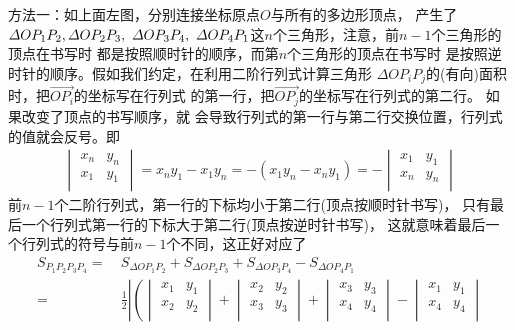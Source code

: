 \begin{itemize}[leftmargin=\inteval{\myitemleftmargin}pt,itemsep=
   \inteval{\myitemitempsep}pt,topsep=\inteval{\myitemtopsep}pt]
\begin{figure}[H]
\end{figure}
方法一：如上面左图，分别连接坐标原点$ O $与所有的多边形顶点，
产生了$ \Delta OP_1P_2,\\ \Delta OP_2P_3,\ \Delta OP_3P_4,\ 
\Delta OP_4P_1 $这$ n $个三角形，注意，前$ n-1 $个三角形的顶点在书写时
都是按照顺时针的顺序，而第$ n $个三角形的顶点在书写时
是按照逆时针的顺序。假如我们约定，在利用二阶行列式计算三角形
$ \Delta OP_iP_j $的(有向)面积时，把$ \vec{OP_i} $的坐标写在行列式
的第一行，把$ \vec{OP_j} $的坐标写在行列式的第二行。
如果改变了顶点的书写顺序，就
会导致行列式的第一行与第二行交换位置，行列式的值就会反号。即
\begin{gather*}
    \begin{vmatrix}
        {x_{n}} & {y_{n}} \\
        {x_1} & {y_1} \\
    \end{vmatrix} =x_ny_1-x_1y_n=-(x_1y_n-x_ny_1)=-
    \begin{vmatrix}
        {x_1} & {y_1} \\
        {x_{n}} & {y_{n}} \\
    \end{vmatrix}
\end{gather*}
前$ n-1 $个二阶行列式，第一行的下标均小于第二行(顶点按顺时针书写)，
只有最后一个行列式第一行的下标大于第二行(顶点按逆时针书写)，
这就意味着最后一个行列式的符号与前$ n-1 $个不同，这正好对应了
\begin{align*}
    S_{P_1P_2P_3P_4}=&\ S_{\Delta OP_1P_2}+S_{\Delta OP_2P_3}+
    S_{\Delta OP_3P_4}-S_{\Delta OP_4P_1} \\
    =&\ \frac{1}{2} \left|\left(
    \begin{vmatrix}
        {x_1} & {y_1} \\
        {x_2} & {y_2} \\
    \end{vmatrix}+
    \begin{vmatrix}
        {x_2} & {y_2} \\
        {x_3} & {y_3} \\
    \end{vmatrix}+
    \begin{vmatrix}
        {x_3} & {y_3} \\
        {x_4} & {y_4} \\
    \end{vmatrix} -
    \begin{vmatrix}
        {x_1} & {y_1} \\
        {x_4} & {y_4} \\

\end{vmatrix}
\end{align*}
\end{itemize}
